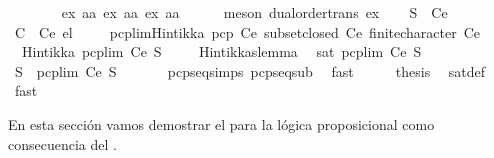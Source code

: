 \begin{isabellebody}
\ \ \ \ \ \ \isamarkupfalse%
\ ex{}{\isacharbrackleft}\ {\isacharprime}a{\isacharequal}{\isacharprime}a{\isacharbrackright}\ ex{}{\isacharbrackleft}\ {\isacharprime}a{\isacharequal}{\isacharprime}a{\isacharbrackright}\ ex{}{\isacharbrackleft}\ {\isacharprime}a{\isacharequal}{\isacharprime}a{\isacharbrackright}\isanewline
\ \ \ \ \isamarkupfalse%
\ {\isacharparenleft}meson\ dual{\isacharunderscore}order{\isachardot}trans\ ex{}{\isacharparenright}\isanewline
\ \ \isamarkupfalse%
\ {\isachardoublequoteopen}S\ {\isasymin}\ Ce{\isachardoublequoteclose}\ \isamarkupfalse%
\ {\isacartoucheopen}C\ {\isasymsubseteq}\ Ce{\isacartoucheclose}\ el\ \isacommand{{\isachardot}{\isachardot}}\isamarkupfalse%
\isanewline
\ \ \isamarkupfalse%
\ pcp{\isacharunderscore}lim{\isacharunderscore}Hintikka\ {\isacartoucheopen}pcp\ Ce{\isacartoucheclose}\ {\isacartoucheopen}subset{\isacharunderscore}closed\ Ce{\isacartoucheclose}\ {\isacartoucheopen}finite{\isacharunderscore}character\ Ce{\isacartoucheclose}\isanewline
\ \ \isamarkupfalse%
\ \ {\isachardoublequoteopen}Hintikka\ {\isacharparenleft}pcp{\isacharunderscore}lim\ Ce\ S{\isacharparenright}{\isachardoublequoteclose}\ \isacommand{{\isachardot}}\isamarkupfalse%
\isanewline
\ \ \isamarkupfalse%
\ Hintikkaslemma\ \isamarkupfalse%
\ {\isachardoublequoteopen}sat\ {\isacharparenleft}pcp{\isacharunderscore}lim\ Ce\ S{\isacharparenright}{\isachardoublequoteclose}\ \isacommand{{\isachardot}}\isamarkupfalse%
\isanewline
\ \ \isamarkupfalse%
\ \isamarkupfalse%
\ {\isachardoublequoteopen}S\ {\isasymsubseteq}\ pcp{\isacharunderscore}lim\ Ce\ S{\isachardoublequoteclose}\ \isanewline
\ \ \ \ \isamarkupfalse%
\ pcp{\isacharunderscore}seq{\isachardot}simps{\isacharparenleft}{}{\isacharparenright}\ pcp{\isacharunderscore}seq{\isacharunderscore}sub\ \isamarkupfalse%
\ fast\isanewline
\ \ \isamarkupfalse%
\ \isamarkupfalse%
\ {\isacharquery}thesis\ \isamarkupfalse%
\ sat{\isacharunderscore}def\ \isamarkupfalse%
\ fast\isanewline
{}\isamarkupfalse%
%
\endisatagproof
{\isafoldproof}%
%
\isadelimproof
%
\endisadelimproof
%
\isadelimdocument
%
\endisadelimdocument
%
\isatagdocument
%
\isamarkuptrue%
%
\endisatagdocument
{\isafolddocument}%
%
\isadelimdocument
%
\endisadelimdocument
%
\begin{isamarkuptext}%
En esta sección vamos demostrar el  para la lógica proposicional
  como consecuencia del .


\end{isamarkuptext}
\end{isabellebody}
